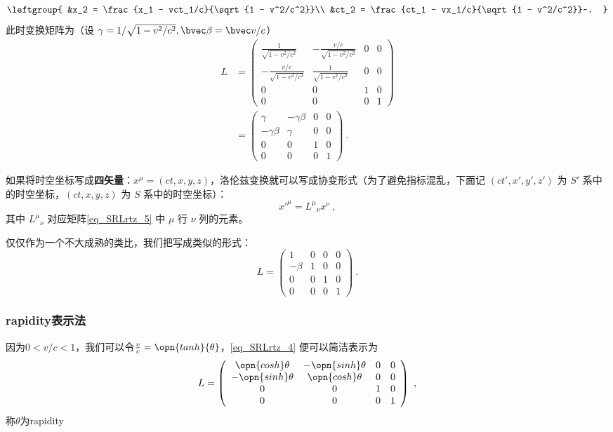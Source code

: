 \begin{equation}
\leftgroup{
&x_2 = \frac{x_1 - vct_1/c}{\sqrt{1 - v^2/c^2}}\\
&ct_2 = \frac{ct_1 - vx_1/c}{\sqrt{1 - v^2/c^2}}~.
}
\end{equation}
此时变换矩阵为（设 $\gamma=1/\sqrt{1-v^2/c^2},\bvec \beta=\bvec v/c$）
\begin{equation}\label{eq_SRLrtz_5}
\begin{aligned}
L&=
\left(\begin{matrix}
\frac{1}{\sqrt{1-v^2/c^2}}& -\frac{v/c}{\sqrt{1-v^2/c^2}}& 0& 0\\
-\frac{v/c}{\sqrt{1-v^2/c^2}}& \frac{1}{\sqrt{1-v^2/c^2}}& 0& 0\\
0&0&1&0\\
0&0&0&1
\end{matrix}\right)\\
&=
\left(\begin{matrix}
\gamma& -\gamma\beta& 0& 0\\
-\gamma\beta& \gamma& 0& 0\\
0&0&1&0\\
0&0&0&1
\end{matrix}\right)~.
\end{aligned}
\end{equation}

如果将时空坐标写成\textbf{四矢量}：$x^{\mu}=(ct,x,y,z)$，洛伦兹变换就可以写成协变形式（为了避免指标混乱，下面记 $(ct',x',y',z')$ 为 $S'$ 系中的时空坐标，$(ct,x,y,z)$ 为 $S$ 系中的时空坐标）：
\begin{equation}
x'^{\mu}={L^\mu}_\nu x^\nu~,
\end{equation}
其中 ${L^\mu}_\nu$ 对应矩阵\autoref{eq_SRLrtz_5} 中 $\mu$ 行 $\nu$ 列的元素。

仅仅作为一个不大成熟的类比，我们把写成类似的形式：
$$
L=\left(\begin{matrix}
1& 0& 0& 0\\
-\beta& 1& 0& 0\\
0&0&1&0\\
0&0&0&1
\end{matrix}\right)~.
$$
\subsubsection{rapidity表示法}
因为$0<v/c<1$，我们可以令$\frac{v}{c}=\opn{tanh}{\theta}$，\autoref{eq_SRLrtz_4} 便可以简洁表示为
\begin{equation}
L=\left(\begin{array}{cccc}\opn{cosh}\theta & -\opn{sinh}\theta & 0 & 0 \\ -\opn{sinh}\theta & \opn{cosh}\theta & 0 & 0 \\ 0 & 0 & 1 & 0 \\ 0 & 0 & 0 & 1\end{array}\right)
~,\end{equation}
称$\theta$为rapidity



